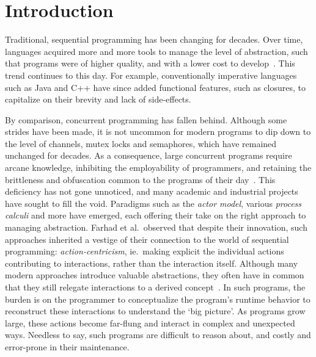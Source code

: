 \chapter{Introduction}
Traditional, sequential programming has been changing for decades. Over time, languages acquired more and more tools to manage the level of abstraction, such that programs were of higher quality, and with a lower cost to develop~\cite{shaw1984abstraction}. This trend continues to this day. For example, conventionally imperative languages such as Java and C++ have since added functional features, such as closures, to capitalize on their brevity and lack of side-effects. 

By comparison, concurrent programming has fallen behind. Although some strides have been made, it is not uncommon for modern programs to dip down to the level of channels, mutex locks and semaphores, which have remained unchanged for decades. As a consequence, large concurrent programs require arcane knowledge, inhibiting the employability of programmers, and retaining the brittleness and obfuscation common to the programs of their day~\cite{chamberlain2007parallel}. This deficiency has not gone unnoticed, and many academic and industrial projects have sought to fill the void. Paradigms such as the \textit{actor model}, various \textit{process calculi} and more have emerged, each offering their take on the right approach to managing abstraction. Farhad et al.\ observed that despite their innovation, such approaches inherited a vestige of their connection to the world of sequential programming: \textit{action-centricism}, ie.\ making explicit the individual actions contributing to interactions, rather than the interaction itself. Although many modern approaches introduce valuable abstractions, they often have in common that they still relegate interactions to a derived concept~\cite{arbab2011puff}. In such programs, the burden is on the programmer to conceptualize the program's runtime behavior to reconstruct these interactions to understand the `big picture'. As programs grow large, these actions become far-flung and interact in complex and unexpected ways. Needless to say, such programs are difficult to reason about, and costly and error-prone in their maintenance.

